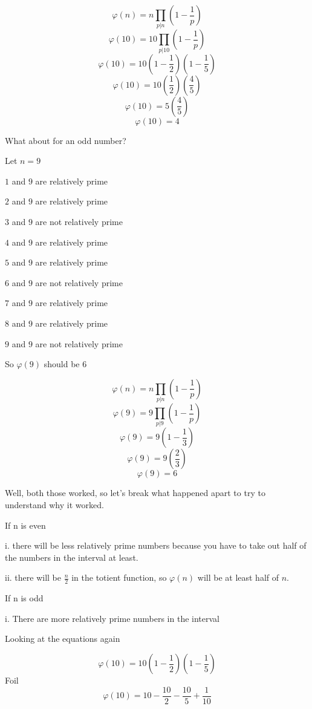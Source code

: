 \documentclass[10pt, AMS Euler]{article}
\begin{document}
\begin{enumerate}
        $$ \varphi(n) = n \prod_{p | n}\left(1-\frac{1}{p}\right) $$
        $$ \varphi(10) = 10 \prod_{p | 10}\left(1-\frac{1}{p}\right) $$
        $$ \varphi(10) = 10 (1-\frac{1}{2})(1-\frac{1}{5}) $$
        $$ \varphi(10) = 10 (\frac{1}{2})(\frac{4}{5}) $$
        $$ \varphi(10) = 5(\frac{4}{5}) $$
        $$ \varphi(10) = 4 $$

        What about for an odd number?

        Let $n = 9$
        
        $1$ and $9$ are relatively prime

        $2$ and $9$ are relatively prime

        $3$ and $9$ are not relatively prime

        $4$ and $9$ are relatively prime

        $5$ and $9$ are relatively prime

        $6$ and $9$ are not relatively prime

        $7$ and $9$ are relatively prime

        $8$ and $9$ are relatively prime

        $9$ and $9$ are not relatively prime

        So $\varphi(9)$ should be $6$

        $$ \varphi(n) = n \prod_{p | n}\left(1-\frac{1}{p}\right) $$
        $$ \varphi(9) = 9 \prod_{p | 9}\left(1-\frac{1}{p}\right) $$
        $$ \varphi(9) = 9 (1-\frac{1}{3}) $$
        $$ \varphi(9) = 9 (\frac{2}{3}) $$
        $$ \varphi(9) = 6 $$
        

        Well, both those worked, so let's break what happened apart to try to understand why it worked.

        If n is even

        i. there will be less relatively prime numbers because you have to take out half of the numbers in the interval at least.
        
        ii. there will be $\frac{n}{2}$ in the totient function, so $\varphi(n)$ will be at least half of $n$.
        
        If n is odd

        i. There are more relatively prime numbers in the interval

        
        Looking at the equations again
        
		$$ \varphi(10) = 10 (1-\frac{1}{2})(1-\frac{1}{5}) $$
        Foil
        $$ \varphi(10) = 10 - \frac{10}{2} - \frac{10}{5} + \frac{1}{10} $$



\end{enumerate}
\end{document}
